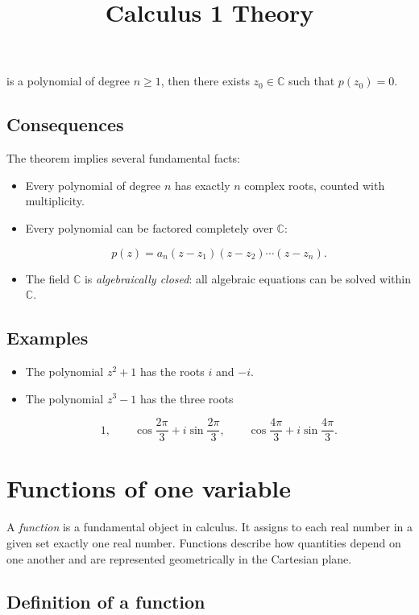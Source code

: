 \documentclass[11pt,a4paper]{article} \usepackage[T1]{fontenc}
\theoremstyle{plain} \newtheorem{theorem}{Theorem} \title{Calculus 1 Theory}
\begin{document}
is a polynomial of degree $n\ge 1$, then there exists $z_0 \in \mathbb{C}$ such
that $p(z_0)=0$.

\subsection*{Consequences}

The theorem implies several fundamental facts:

\begin{itemize}
\item Every polynomial of degree $n$ has exactly $n$ complex roots, counted
with multiplicity.
\item Every polynomial can be factored completely over $\mathbb{C}$:

\[
p(z) = a_n (z - z_1)(z - z_2)\cdots(z - z_n).
\]

\item The field $\mathbb{C}$ is \emph{algebraically closed}: all algebraic
equations can be solved within $\mathbb{C}$.
\end{itemize}

\subsection*{Examples}

\begin{itemize}
\item The polynomial $z^2 + 1$ has the roots $i$ and $-i$.
\item The polynomial $z^3 - 1$ has the three roots

\[
1,\qquad
\cos\frac{2\pi}{3} + i\sin\frac{2\pi}{3},\qquad
\cos\frac{4\pi}{3} + i\sin\frac{4\pi}{3}.
\]

\end{itemize}

\section{Functions of one variable}

A \emph{function} is a fundamental object in calculus. It assigns to each real
number in a given set exactly one real number. Functions describe how
quantities depend on one another and are represented geometrically in the
Cartesian plane.

\subsection*{Definition of a function}
\end{document}
